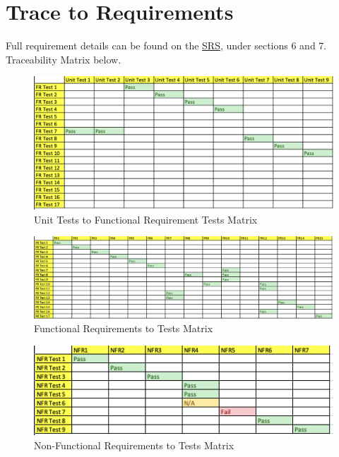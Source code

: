 \documentclass[12pt, titlepage]{article}
\begin{document}
\section{Trace to Requirements}
Full requirement details can be found on the \href{https://github.com/Dorps/aiboardgame/blob/main/docs/SRS/SRS.pdf}{SRS}, under sections 6 and 7. Traceability Matrix below.
\begin{figure}[!h]
    \centering
    \includegraphics[width=\textwidth]{Unit.png}
    \caption{Unit Tests to Functional Requirement Tests Matrix}
    \label{Functional Requirements to Tests Matrix}
\end{figure}
\begin{figure}[!h]
    \centering
    \includegraphics[width=\textwidth]{FR.png}
    \caption{Functional Requirements to Tests Matrix}
    \label{Functional Requirements to Tests Matrix}
\end{figure}
\begin{figure}[!ht]
    \centering
    \includegraphics[width=\textwidth]{NFR.png}
    \caption{Non-Functional Requirements to Tests Matrix}
    \label{Non-Functional Requirements to Tests Matrix}
\end{figure}
\end{document}
